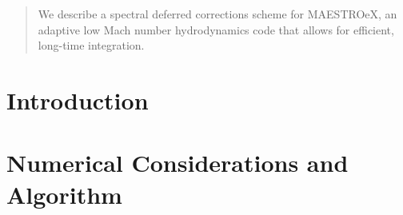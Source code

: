 \documentclass{aastex63}
\begin{document}
\begin{abstract}
  We describe a spectral deferred corrections scheme for MAESTROeX, an adaptive
  low Mach number hydrodynamics code that allows for efficient, long-time integration. 
\end{abstract}



\section{Introduction} \label{sec:intro}


\section{Numerical Considerations and Algorithm} \label{sec:equations}
\end{document}
